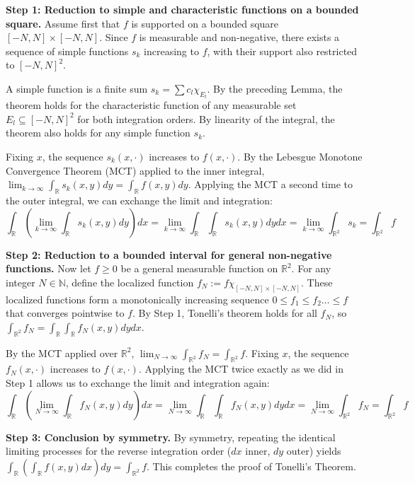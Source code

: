 \begin{pfbox}
    \textbf{Step 1: Reduction to simple and characteristic functions on a bounded square.}
    Assume first that $f$ is supported on a bounded square $[-N,N] \times [-N,N]$. Since $f$ is measurable and non-negative, there exists a sequence of simple functions $s_k$ increasing to $f$, with their support also restricted to $[-N,N]^2$.
    
    A simple function is a finite sum $s_k = \displaystyle\sum c_l \chi_{E_l}$. By the preceding Lemma, the theorem holds for the characteristic function of any measurable set $E_l \subseteq [-N,N]^2$ for both integration orders. By linearity of the integral, the theorem also holds for any simple function $s_k$.
    
    Fixing $x$, the sequence $s_k(x, \cdot)$ increases to $f(x, \cdot)$. By the Lebesgue Monotone Convergence Theorem (MCT) applied to the inner integral, $\displaystyle\lim_{k\to\infty} \int_\mathbb{R} s_k(x,y)dy = \int_\mathbb{R} f(x,y)dy$.
    Applying the MCT a second time to the outer integral, we can exchange the limit and integration: 
    $$ \int_\mathbb{R} \left(\lim_{k\to\infty} \int_\mathbb{R} s_k(x,y)dy\right)dx = \lim_{k\to\infty} \int_\mathbb{R} \int_\mathbb{R} s_k(x,y) dy dx = \lim_{k\to\infty} \int_{\mathbb{R}^2} s_k = \int_{\mathbb{R}^2} f $$

    \textbf{Step 2: Reduction to a bounded interval for general non-negative functions.}
    Now let $f \ge 0$ be a general measurable function on $\mathbb{R}^2$. For any integer $N \in \mathbb{N}$, define the localized function $f_N := f \chi_{[-N,N] \times [-N,N]}$.
    These localized functions form a monotonically increasing sequence $0 \le f_1 \le f_2 \dots \le f$ that converges pointwise to $f$. 
    By Step 1, Tonelli's theorem holds for all $f_N$, so $\int_{\mathbb{R}^2} f_N = \int_\mathbb{R} \int_\mathbb{R} f_N(x,y)dy dx$.
    
    By the MCT applied over $\mathbb{R}^2$, $\displaystyle\lim_{N\to\infty} \int_{\mathbb{R}^2} f_N = \int_{\mathbb{R}^2} f$.
    Fixing $x$, the sequence $f_N(x, \cdot)$ increases to $f(x, \cdot)$. Applying the MCT twice exactly as we did in Step 1 allows us to exchange the limit and integration again:
    $$ \int_\mathbb{R} \left(\lim_{N\to\infty} \int_\mathbb{R} f_N(x,y)dy\right)dx = \lim_{N\to\infty} \int_\mathbb{R} \int_\mathbb{R} f_N(x,y) dy dx = \lim_{N\to\infty} \int_{\mathbb{R}^2} f_N = \int_{\mathbb{R}^2} f $$
    
    \textbf{Step 3: Conclusion by symmetry.}
    By symmetry, repeating the identical limiting processes for the reverse integration order ($dx$ inner, $dy$ outer) yields $\int_\mathbb{R} \left( \int_\mathbb{R} f(x,y) dx \right) dy = \int_{\mathbb{R}^2} f$. This completes the proof of Tonelli's Theorem.
\end{pfbox}


